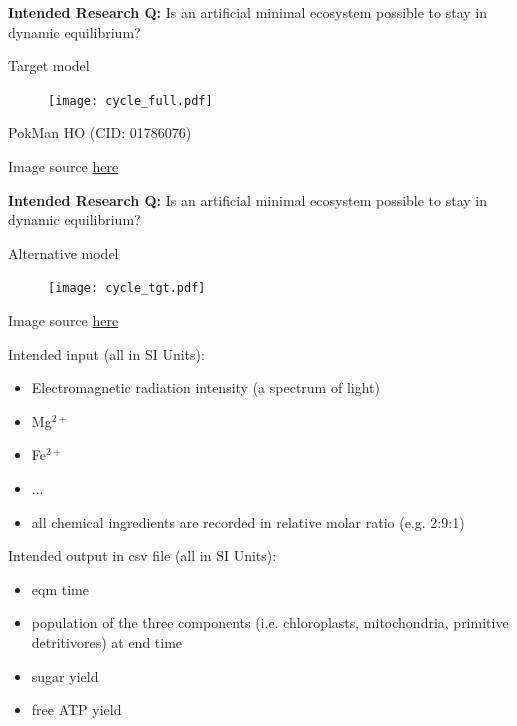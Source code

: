 \documentclass[xcolor=x11names, compress]{beamer}
\begin{document}
	\begin{frame}
		\begin{center}
			\textbf{Intended Research Q:} Is an artificial minimal ecosystem possible to stay in dynamic equilibrium?
		\end{center}
	Target model\\
		\begin{figure}[h]
			\centering\texttt{[image: cycle\_full.pdf]}
		\end{figure}
	\begin{flushright}
		PokMan HO (CID: 01786076)
	\end{flushright}
		Image source \href{https://biologyeducare.com/difference-between-mitochondria-and-chloroplast/}{here}
	\end{frame}

	\begin{frame}
		\begin{center}
			\textbf{Intended Research Q:} Is an artificial minimal ecosystem possible to stay in dynamic equilibrium?
		\end{center}
	Alternative model\\
		\begin{figure}[h]
			\centering\texttt{[image: cycle\_tgt.pdf]}
		\end{figure}
		Image source \href{https://biologyeducare.com/difference-between-mitochondria-and-chloroplast/}{here}
	\end{frame}

	\begin{frame}
		Intended input (all in SI Units):
		\begin{itemize}\itemsep5pt
			\item Electromagnetic radiation intensity (a spectrum of light)\\
			\item Mg$^{2+}$\\
			\item Fe$^{2+}$\\
			\item ...
			\item all chemical ingredients are recorded in relative molar ratio (e.g. 2:9:1)
		\end{itemize}
		Intended output in csv file (all in SI Units):
		\begin{itemize}\itemsep5pt
			\item eqm time\\
			\item population of the three components (i.e. chloroplasts, mitochondria, primitive detritivores) at end time\\
			\item sugar yield\\
			\item free ATP yield\\
		\end{itemize}
	\end{frame}
\end{document}
